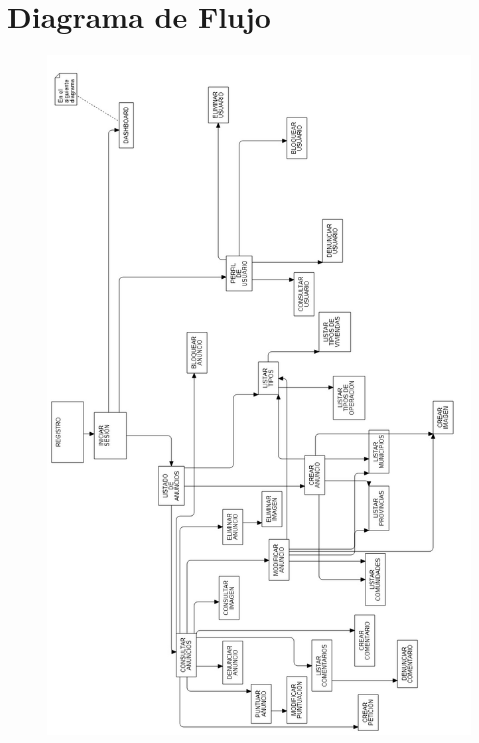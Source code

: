 \chapter{Diagrama de Flujo}

\begin{figure}[h!]
\centering
\includegraphics[width=1\textwidth, height=.7\textheight, angle=90, origin=c]{Img/DIAGRAMASFLUJO/APP.jpg}
\end{figure}

